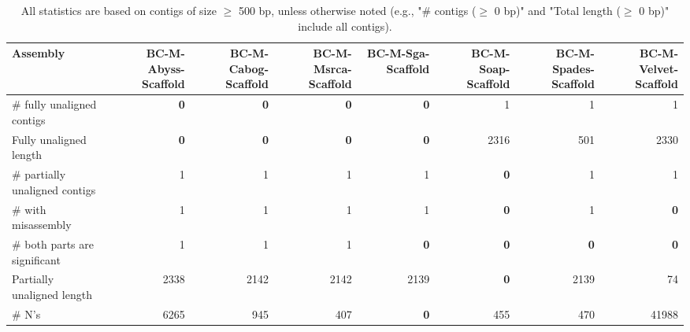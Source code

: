 \documentclass[12pt,a4paper]{article}
\begin{document}
\begin{table}[ht]
\begin{center}
\caption{All statistics are based on contigs of size $\geq$ 500 bp, unless otherwise noted (e.g., "\# contigs ($\geq$ 0 bp)" and "Total length ($\geq$ 0 bp)" include all contigs).}
\begin{tabular}{|l*{7}{|r}|}
\hline
Assembly & BC-M-Abyss-Scaffold & BC-M-Cabog-Scaffold & BC-M-Msrca-Scaffold & BC-M-Sga-Scaffold & BC-M-Soap-Scaffold & BC-M-Spades-Scaffold & BC-M-Velvet-Scaffold \\ \hline
\# fully unaligned contigs & {\bf 0} & {\bf 0} & {\bf 0} & {\bf 0} & 1 & 1 & 1 \\ \hline
Fully unaligned length & {\bf 0} & {\bf 0} & {\bf 0} & {\bf 0} & 2316 & 501 & 2330 \\ \hline
\# partially unaligned contigs & 1 & 1 & 1 & 1 & {\bf 0} & 1 & 1 \\ \hline
\hspace{5mm}\# with misassembly & 1 & 1 & 1 & 1 & {\bf 0} & 1 & {\bf 0} \\ \hline
\hspace{5mm}\# both parts are significant & 1 & 1 & 1 & {\bf 0} & {\bf 0} & {\bf 0} & {\bf 0} \\ \hline
Partially unaligned length & 2338 & 2142 & 2142 & 2139 & {\bf 0} & 2139 & 74 \\ \hline
\# N's & 6265 & 945 & 407 & {\bf 0} & 455 & 470 & 41988 \\ \hline
\end{tabular}
\end{center}
\end{table}
\end{document}
